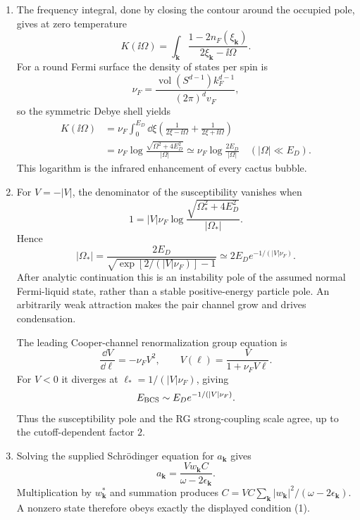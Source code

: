 \begin{enumerate}
\begin{enumerate}
    \item[(d)]
    The frequency integral, done by closing the contour around the
    occupied pole, gives at zero temperature
    \[
      K(\ii\Omega)=
        \int_{\mathbf k}
        \frac{1-2n_F(\xi_{\mathbf k})}{2\xi_{\mathbf k}-\ii\Omega}.
    \]
    For a round Fermi surface the density of states per spin is
    \[
      \nu_F=\frac{\operatorname{vol}(S^{d-1})k_F^{d-1}}
        {(2\pi)^dv_F},
    \]
    so the symmetric Debye shell yields
    \[
      \begin{split}
      K(\ii\Omega)
       &=\nu_F\int_0^{E_D}\dd\xi
          \left(\frac1{2\xi-\ii\Omega}
                +\frac1{2\xi+\ii\Omega}\right)\\
       &=\nu_F\log
          \frac{\sqrt{\Omega^2+4E_D^2}}{|\Omega|}
        \simeq \nu_F\log\frac{2E_D}{|\Omega|}
        \quad (|\Omega|\ll E_D).
      \end{split}
    \]
    This logarithm is the infrared enhancement of every cactus bubble.

    \item[(e)]
    For \(V=-|V|\), the denominator of the susceptibility vanishes when
    \[
      1=|V|\nu_F
        \log\frac{\sqrt{\Omega_*^2+4E_D^2}}{|\Omega_*|}.
    \]
    Hence
    \[
      \boxed{|\Omega_*|
       =\frac{2E_D}
        {\sqrt{\exp[2/(|V|\nu_F)]-1}}
       \simeq2E_D e^{-1/(|V|\nu_F)}.}
    \]
    After analytic continuation this is an instability pole of the
    assumed normal Fermi-liquid state, rather than a stable
    positive-energy particle pole.  An arbitrarily weak attraction makes
    the pair channel grow and drives condensation.

    The leading Cooper-channel renormalization group equation is
    \[
      \frac{\dd V}{\dd\ell}=-\nu_FV^2,\qquad
      V(\ell)=\frac{V}
        {1+\nu_FV\ell}.
    \]
    For \(V<0\) it diverges at
    \(\ell_*=1/(|V|\nu_F)\), giving
    \[
      E_{\rm BCS}\sim E_D e^{-1/(|V|\nu_F)}.
    \]
    Thus the susceptibility pole and the RG strong-coupling scale agree,
    up to the cutoff-dependent factor \(2\).

    \item[(f)]
    Solving the supplied Schrödinger equation for \(a_{\mathbf k}\) gives
    \[
      a_{\mathbf k}=
        \frac{Vw_{\mathbf k}C}{\omega-2\epsilon_{\mathbf k}}.
    \]
    Multiplication by \(w_{\mathbf k}^*\) and summation produces
    \(C=VC\sum_{\mathbf k}|w_{\mathbf k}|^2/
      (\omega-2\epsilon_{\mathbf k})\).  A nonzero state therefore obeys
    exactly the displayed condition (1).


\end{enumerate}
\end{enumerate}
